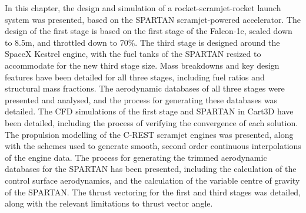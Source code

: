 	In this chapter, the design and simulation of a rocket-scramjet-rocket launch system was presented, based on the SPARTAN scramjet-powered accelerator. 
	The design of the first stage is based on the first stage of the Falcon-1e, scaled down to 8.5m, and throttled down to 70\%. The third stage is designed around the SpaceX Kestrel engine, with the fuel tanks of the SPARTAN resized to accommodate for the new third stage size. 
	 Mass breakdowns and key design features have been detailed for all three stages, including fuel ratios and structural mass fractions.
	 The aerodynamic databases of all three stages were presented and analysed, and the process for generating these databases was detailed. 
	 The CFD simulations of the first stage and SPARTAN in Cart3D have been detailed, including the process of verifying the convergence of each solution. 
	 The propulsion modelling of the C-REST scramjet engines was presented, along with the schemes used to generate smooth, second order continuous interpolations of the engine data. 
	The process for generating the trimmed aerodynamic databases for the SPARTAN has been presented, including the calculation of the control surface aerodynamics, and the calculation of the variable centre of gravity of the SPARTAN. The thrust vectoring for the first and third stages was detailed, along with the relevant limitations to thrust vector angle.
	
	
